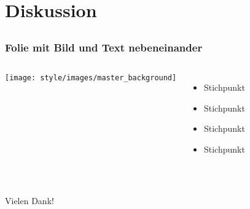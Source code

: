 \section{Diskussion}
\subsection*{}
\begin{frame}
\frametitle{Folie mit Bild und Text nebeneinander}
\begin{columns}
    \column{6cm}
    \vskip5mm
 	    \texttt{[image: style/images/master\_background]}
    \vskip5mm
    \column{5cm}
    \vspace{0cm}
	\begin{itemize}
	 	 \itemsep1.2em
   		 \item Stichpunkt
      	 \item Stichpunkt
       	 \item Stichpunkt
     	 \item Stichpunkt
       	\end{itemize}
 \end{columns}
\end{frame}

\begin{frame}[c]
\frametitle{}
\vskip5mm
\begin{columns}
    \column{12cm}
 	\centering
 	\vspace{0.5cm}
 	\begin{center}
 		\huge{Vielen Dank!}
 	\end{center}
 \end{columns}
\end{frame}




